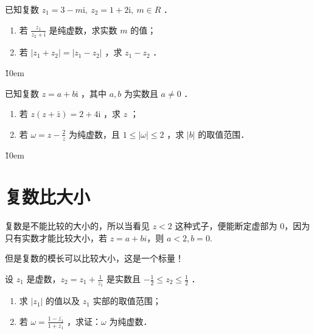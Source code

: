 \begin{example}
    已知复数 $z_1=3-m \mathrm{i}, ~ z_2=1+2 \mathrm{i}, ~ m \in R$ ．
    \begin{enumerate}
        \item 若 $\frac{z_1}{z_2+\mathrm{i}}$ 是纯虚数，求实数 $m$ 的值；
        \item 若 $\left|z_1+z_2\right|=\left|z_1-z_2\right|$ ，求 $z_1-z_2$ ．
    \end{enumerate}
\end{example}

\v{10em}

\begin{example}
    已知复数 $z=a+b \mathrm{i}$ ，其中 $a, b$ 为实数且 $a \neq 0$ ．
    \begin{enumerate}
        \item 若 $z(z+\bar{z})=2+4 \mathrm{i}$ ，求 $z$ ；

        \item 若 $\omega=z-\frac{2}{z}$ 为纯虚数，且 $1 \leq|\omega| \leq 2$ ，求 $|b|$ 的取值范围．
    \end{enumerate}
\end{example}

\v{10em}

\newpage

\section{复数比大小}

\begin{tips}
    复数是不能比较的大小的，所以当看见 $z < 2$ 这种式子，便能断定虚部为 $0$，因为只有实数才能比较大小，若 $z = a + bi$，则 $a < 2, b = 0$.

    \begin{warning}
        但是复数的模长可以比较大小，这是一个标量！
    \end{warning}
\end{tips}

\begin{example}
    设 $z_1$ 是虚数，$z_2=z_1+\frac{1}{z_1}$ 是实数且 $-\frac{1}{2} \leq z_2 \leq \frac{1}{2}$ ．
    \begin{enumerate}
        \item 求 $\left|z_1\right|$ 的值以及 $z_1$ 实部的取值范围；
        \item 若 $\omega=\frac{1-\overline{z_1}}{1+\overline{z_1}}$ ，求证：$\omega$ 为纯虚数．
    \end{enumerate}
\end{example}

